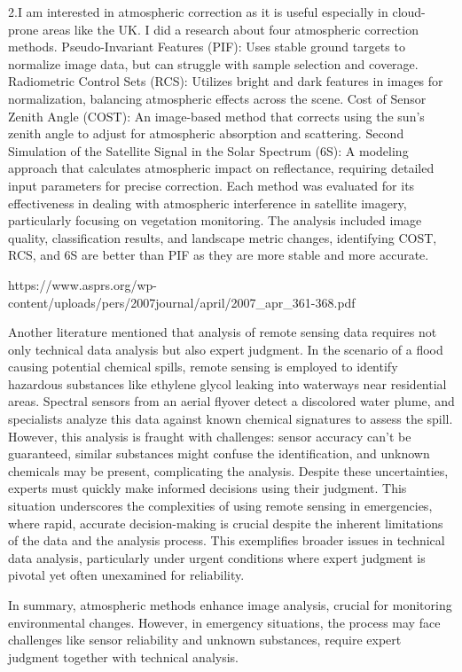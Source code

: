 \documentclass[
  letterpaper,
  DIV=11,
  numbers=noendperiod]{scrreprt}
\begin{document}
2.I am interested in atmospheric correction as it is useful especially
in cloud-prone areas like the UK. I did a research about four
atmospheric correction methods. Pseudo-Invariant Features (PIF): Uses
stable ground targets to normalize image data, but can struggle with
sample selection and coverage. Radiometric Control Sets (RCS): Utilizes
bright and dark features in images for normalization, balancing
atmospheric effects across the scene. Cost of Sensor Zenith Angle
(COST): An image-based method that corrects using the sun's zenith angle
to adjust for atmospheric absorption and scattering. Second Simulation
of the Satellite Signal in the Solar Spectrum (6S): A modeling approach
that calculates atmospheric impact on reflectance, requiring detailed
input parameters for precise correction. Each method was evaluated for
its effectiveness in dealing with atmospheric interference in satellite
imagery, particularly focusing on vegetation monitoring. The analysis
included image quality, classification results, and landscape metric
changes, identifying COST, RCS, and 6S are better than PIF as they are
more stable and more accurate.

https://www.asprs.org/wp-content/uploads/pers/2007journal/april/2007\_apr\_361-368.pdf

Another literature mentioned that analysis of remote sensing data
requires not only technical data analysis but also expert judgment. In
the scenario of a flood causing potential chemical spills, remote
sensing is employed to identify hazardous substances like ethylene
glycol leaking into waterways near residential areas. Spectral sensors
from an aerial flyover detect a discolored water plume, and specialists
analyze this data against known chemical signatures to assess the spill.
However, this analysis is fraught with challenges: sensor accuracy can't
be guaranteed, similar substances might confuse the identification, and
unknown chemicals may be present, complicating the analysis. Despite
these uncertainties, experts must quickly make informed decisions using
their judgment. This situation underscores the complexities of using
remote sensing in emergencies, where rapid, accurate decision-making is
crucial despite the inherent limitations of the data and the analysis
process. This exemplifies broader issues in technical data analysis,
particularly under urgent conditions where expert judgment is pivotal
yet often unexamined for reliability.

In summary, atmospheric methods enhance image analysis, crucial for
monitoring environmental changes. However, in emergency situations, the
process may face challenges like sensor reliability and unknown
substances, require expert judgment together with technical analysis.
\end{document}
